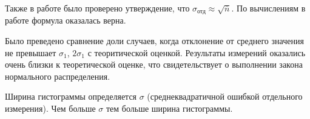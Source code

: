 \documentclass[a4paper,12pt]{article} %
\begin{document}
Также в работе было проверено утверждение, что $\sigma_\text{отд} \approx \sqrt{\overline{n}}$. По вычислениям в работе формула оказалась верна.

Было преведено сравнение доли случаев, когда отклонение от среднего значения не превышает $\sigma_1$, $2\sigma_1$ с теоритической оценкой. Результаты измерений оказались очень близки к теоретической оценке, что свидетельствует о выполнении закона нормального распределения.

Ширина гистограммы определяется $\sigma$ (среднеквадратичной ошибкой отдельного измерения). Чем больше $\sigma$  тем больше ширина гистограммы.
\end{document}
